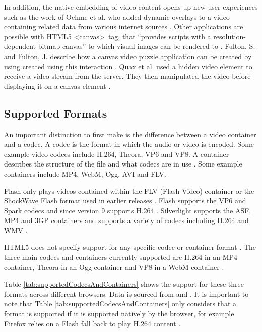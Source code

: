 \documentclass[journal]{IEEEtran}
\begin{document}
In addition, the native embedding of video content opens up new user experiences such as the work of Oehme et al. who added dynamic overlays to a video containing related data from various internet sources \cite{inproceedings:theChroomaApproach}. Other applications are possible with HTML5 \textless canvas\textgreater~tag, that ``provides scripts with a resolution-dependent bitmap canvas'' to which visual images can be rendered to \cite{standard:html5}. Fulton, S. and Fulton, J. describe how a canvas video puzzle application can be created by using created using this interaction \cite{book:html5canvas}. Quax et al. used a hidden video element to receive a video stream from the server. They then manipulated the video before displaying it on a canvas element \cite{inproceedings:aPracticalAndScableMethodForStreaming}.

\subsection{Supported Formats}
An important distinction to first make is the difference between a video container and a codec. A codec is the format in which the audio or video is encoded. Some example video codecs include H.264, Theora, VP6 and VP8. A container describes the structure of the file and what codecs are in use \cite{website:videoFormatsGuide}. Some example containers include MP4, WebM, Ogg, AVI and FLV.

Flash only plays videos contained within the FLV (Flash Video) container or the ShockWave Flash format used in earlier releases \cite{article:flashPlayer}. Flash supports the VP6 and Spark codecs \cite{article:flashPlayer} and since version 9 supports H.264 \cite{website:flashSupportedFormats}. Silverlight supports the ASF, MP4 and 3GP containers and supports a variety of codecs including H.264 and WMV \cite{website:silverlightSupportedFormats}.

HTML5 does not specify support for any specific codec or container format \cite{article:towardsVideoOnTheWebWithHTML5}. The three main codecs and containers currently supported are H.264 in an MP4 container, Theora in an Ogg container and VP8 in a WebM container \cite{article:towardsVideoOnTheWebWithHTML5}.

Table \ref{tab:supportedCodecsAndContainers} shows the support for these three formats across different browsers. Data is sourced from  \cite{inproceedings:applicationOfHTML5Multimedia} and  \cite{article:towardsVideoOnTheWebWithHTML5}. It is important to note that Table \ref{tab:supportedCodecsAndContainers} only considers that a format is supported if it is supported natively by the browser, for example Firefox relies on a Flash fall back to play H.264 content \cite{website:firefoxVideoMobileAndTheOpenWeb}.
\end{document}
